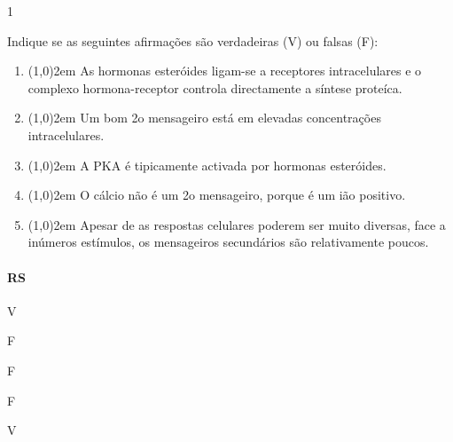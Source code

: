 \documentclass[\mainfilename]{subfiles}
\begin{document}
\begin{questionBox}1{} %
    
    Indique se as seguintes afirmações são verdadeiras (V) ou falsas (F):

    \begin{enumerate}[label=(\roman{enumi})]
        \item \line(1,0){2em}{} As hormonas esteróides ligam-se a receptores intracelulares e o complexo hormona-receptor controla directamente a síntese proteíca.
        \item \line(1,0){2em}{} Um bom 2o mensageiro está em elevadas concentrações intracelulares. 
        \item \line(1,0){2em}{} A PKA é tipicamente activada por hormonas esteróides.
        \item \line(1,0){2em}{} O cálcio não é um 2o mensageiro, porque é um ião positivo.
        \item \line(1,0){2em}{} Apesar de as respostas celulares poderem ser muito diversas, face a inúmeros estímulos, os mensageiros secundários são relativamente poucos.
    \end{enumerate}

    \paragraph*{RS}
    \begin{minipage}{\textwidth}
        \begin{enumerate}[label=(\roman{enumi})]
            \begin{multicols}{5}
                \item V
                \item F
                \item F
                \item F
                \item V
            \end{multicols}
        \end{enumerate}
    \end{minipage}
    
\end{questionBox}
\end{document}
